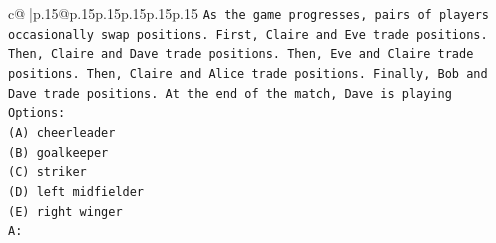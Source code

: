\documentclass{article}
\begin{document}
{\begin{supertabular}{c@{$\;$}|p{.15\linewidth}@{}p{.15\linewidth}p{.15\linewidth}p{.15\linewidth}p{.15\linewidth}p{.15\linewidth}}
{{{\texttt{As the game progresses, pairs of players occasionally swap positions. First, Claire and Eve trade positions. Then, Claire and Dave trade positions. Then, Eve and Claire trade positions. Then, Claire and Alice trade positions. Finally, Bob and Dave trade positions. At the end of the match, Dave is playing} \\
\texttt{Options:} \\
\texttt{(A) cheerleader} \\
\texttt{(B) goalkeeper} \\
\texttt{(C) striker} \\
\texttt{(D) left midfielder} \\
\texttt{(E) right winger} \\
\texttt{A:} \\
            }
        }
    }
     \\ \\


\end{supertabular}}
\end{document}
